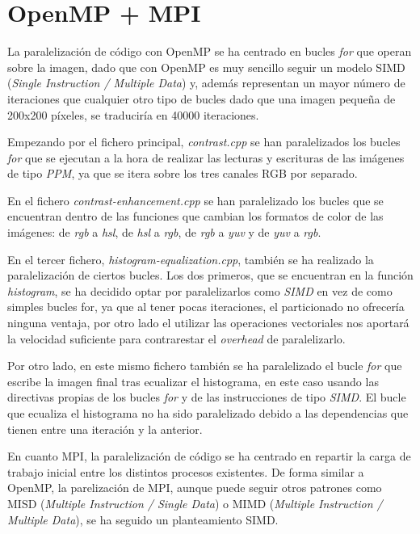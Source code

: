 \documentclass[12pt]{report} %
\begin{document}
\section{OpenMP + MPI}
\label{sec:OpenMP+MPI}

La paralelización de código con OpenMP se ha centrado en bucles \textit{for} que operan sobre la imagen,
dado que con OpenMP es muy sencillo seguir un modelo SIMD (\textit{Single Instruction / Multiple Data})
y, además representan un mayor número de iteraciones que cualquier otro tipo de bucles dado que una
imagen pequeña de 200x200 píxeles, se traduciría en 40000 iteraciones.

Empezando por el fichero principal, \textit{contrast.cpp} se han paralelizados los bucles
\textit{for} que se ejecutan a la hora de realizar las lecturas y escrituras de las imágenes de
tipo \textit{PPM}, ya que se itera sobre los tres canales RGB por separado.

En el fichero \textit{contrast-enhancement.cpp} se han paralelizado los bucles que
se encuentran dentro de las funciones que cambian los formatos de color de las imágenes: de \textit{rgb}
a \textit{hsl}, de \textit{hsl} a \textit{rgb}, de \textit{rgb} a \textit{yuv} y de \textit{yuv}
a \textit{rgb}.

En el tercer fichero, \textit{histogram-equalization.cpp}, también se ha realizado la paralelización
de ciertos bucles. Los dos primeros, que se encuentran en la función \textit{histogram}, se ha decidido
optar por paralelizarlos como \textit{SIMD} en vez de como simples bucles for, ya que al tener pocas
iteraciones, el particionado no ofrecería ninguna ventaja, por otro lado el utilizar las operaciones
vectoriales nos aportará la velocidad suficiente para contrarestar el \textit{overhead} de paralelizarlo.

Por otro lado, en este mismo fichero también se ha paralelizado el bucle \textit{for} que escribe la imagen
final tras ecualizar el histograma, en este caso usando las directivas propias de los bucles \textit{for} y
de las instrucciones de tipo \textit{SIMD}. El bucle que ecualiza el histograma no ha sido paralelizado
debido a las dependencias que tienen entre una iteración y la anterior.

En cuanto MPI, la paralelización de código se ha centrado en repartir la carga de trabajo inicial entre los distintos
procesos existentes. De forma similar a OpenMP, la parelización de MPI, aunque puede seguir otros
patrones como MISD (\textit{Multiple Instruction / Single Data}) o MIMD (\textit{Multiple Instruction
/ Multiple Data}), se ha seguido un planteamiento SIMD.
\end{document}
